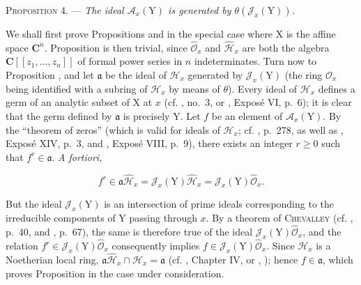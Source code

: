\textsc{Proposition 4}. --- \emph{The ideal $\mathcal{A}_x(\mathrm{Y})$ is generated by $\theta(\mathcal{J}_x(\mathrm{Y}))$.}

We shall first prove Propositions  and  in the special case where $\mathrm{X}$ is the affine space $\mathbf{C}^n$. Proposition  is then trivial, since $\hat{\mathcal{O}}_x$ and $\hat{\mathcal{H}}_x$ are both the algebra $\mathbf{C}[[z_1,\ldots,z_n]]$ of formal power series in $n$ indeterminates. Turn now to Proposition , and let $\mathfrak{a}$ be the ideal of $\mathcal{H}_x$ generated by $\mathcal{J}_x(\mathrm{Y})$ (the ring $\mathcal{O}_x$ being identified with a subring of $\mathcal{H}_x$ by means of $\theta$). Every ideal of $\mathcal{H}_x$ defines a germ of an analytic subset of $\mathrm{X}$ at $x$ (cf. , no.~3, or , Expos\'e VI, p.~6); it is clear that the germ defined by $\mathfrak{a}$ is precisely $\mathrm{Y}$. Let $f$ be an element of $\mathcal{A}_x(\mathrm{Y})$. By the ``theorem of zeros'' (which is valid for ideals of $\mathcal{H}_x$; cf. , p.~278, as well as , Expos\'e XIV, p.~3, and , Expos\'e VIII, p.~9), there exists an integer $r\geqslant0$ such that $f^r\in\mathfrak{a}$. \emph{A fortiori},

\begin{equation*}
f^r\in\mathfrak{a}\hat{\mathcal{H}}_x
=\mathcal{J}_x(\mathrm{Y})\hat{\mathcal{H}}_x
=\mathcal{J}_x(\mathrm{Y})\hat{\mathcal{O}}_x.
\end{equation*}

But the ideal $\mathcal{J}_x(\mathrm{Y})$ is an intersection of prime ideals corresponding to the irreducible components of $\mathrm{Y}$ passing through $x$. By a theorem of \textsc{Chevalley} (cf. , p.~40, and , p.~67), the same is therefore true of the ideal $\mathcal{J}_x(\mathrm{Y})\hat{\mathcal{O}}_x$, and the relation $f^r\in\mathcal{J}_x(\mathrm{Y})\hat{\mathcal{O}}_x$ consequently implies $f\in\mathcal{J}_x(\mathrm{Y})\hat{\mathcal{O}}_x$. Since $\mathcal{H}_x$ is a Noetherian local ring, $\mathfrak{a}\hat{\mathcal{H}}_x\cap\mathcal{H}_x=\mathfrak{a}$ (cf. , Chapter IV, or , ); hence $f\in\mathfrak{a}$, which proves Proposition  in the case under consideration.

